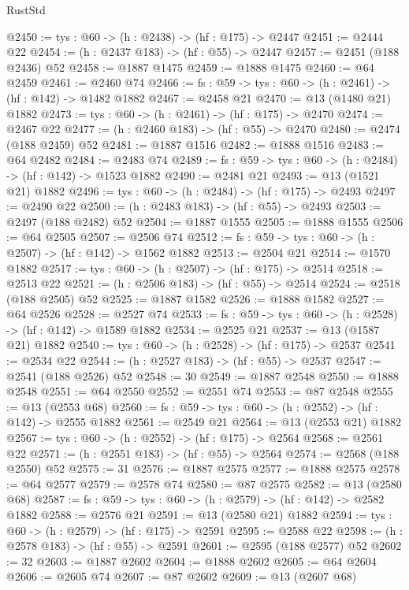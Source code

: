 \begin{lexlean}{RustStd}
\begin{coremodule}
@2450 := {tys : @60} -> (h : @2438) -> (hf : @175) -> @2447
@2451 := @2444 @22
@2454 := (h : @2437 @183) -> (hf : @55) -> @2447
@2457 := @2451 (@188 @2436) @52
@2458 := @1887 @1475
@2459 := @1888 @1475
@2460 := @64 @2459
@2461 := @2460 @74
@2466 := {fs : @59} -> {tys : @60} -> (h : @2461) -> (hf : @142) -> @1482 @1882
@2467 := @2458 @21
@2470 := @13 (@1480 @21) @1882
@2473 := {tys : @60} -> (h : @2461) -> (hf : @175) -> @2470
@2474 := @2467 @22
@2477 := (h : @2460 @183) -> (hf : @55) -> @2470
@2480 := @2474 (@188 @2459) @52
@2481 := @1887 @1516
@2482 := @1888 @1516
@2483 := @64 @2482
@2484 := @2483 @74
@2489 := {fs : @59} -> {tys : @60} -> (h : @2484) -> (hf : @142) -> @1523 @1882
@2490 := @2481 @21
@2493 := @13 (@1521 @21) @1882
@2496 := {tys : @60} -> (h : @2484) -> (hf : @175) -> @2493
@2497 := @2490 @22
@2500 := (h : @2483 @183) -> (hf : @55) -> @2493
@2503 := @2497 (@188 @2482) @52
@2504 := @1887 @1555
@2505 := @1888 @1555
@2506 := @64 @2505
@2507 := @2506 @74
@2512 := {fs : @59} -> {tys : @60} -> (h : @2507) -> (hf : @142) -> @1562 @1882
@2513 := @2504 @21
@2514 := @1570 @1882
@2517 := {tys : @60} -> (h : @2507) -> (hf : @175) -> @2514
@2518 := @2513 @22
@2521 := (h : @2506 @183) -> (hf : @55) -> @2514
@2524 := @2518 (@188 @2505) @52
@2525 := @1887 @1582
@2526 := @1888 @1582
@2527 := @64 @2526
@2528 := @2527 @74
@2533 := {fs : @59} -> {tys : @60} -> (h : @2528) -> (hf : @142) -> @1589 @1882
@2534 := @2525 @21
@2537 := @13 (@1587 @21) @1882
@2540 := {tys : @60} -> (h : @2528) -> (hf : @175) -> @2537
@2541 := @2534 @22
@2544 := (h : @2527 @183) -> (hf : @55) -> @2537
@2547 := @2541 (@188 @2526) @52
@2548 := 30
@2549 := @1887 @2548
@2550 := @1888 @2548
@2551 := @64 @2550
@2552 := @2551 @74
@2553 := @87 @2548
@2555 := @13 (@2553 @68)
@2560 := {fs : @59} -> {tys : @60} -> (h : @2552) -> (hf : @142) -> @2555 @1882
@2561 := @2549 @21
@2564 := @13 (@2553 @21) @1882
@2567 := {tys : @60} -> (h : @2552) -> (hf : @175) -> @2564
@2568 := @2561 @22
@2571 := (h : @2551 @183) -> (hf : @55) -> @2564
@2574 := @2568 (@188 @2550) @52
@2575 := 31
@2576 := @1887 @2575
@2577 := @1888 @2575
@2578 := @64 @2577
@2579 := @2578 @74
@2580 := @87 @2575
@2582 := @13 (@2580 @68)
@2587 := {fs : @59} -> {tys : @60} -> (h : @2579) -> (hf : @142) -> @2582 @1882
@2588 := @2576 @21
@2591 := @13 (@2580 @21) @1882
@2594 := {tys : @60} -> (h : @2579) -> (hf : @175) -> @2591
@2595 := @2588 @22
@2598 := (h : @2578 @183) -> (hf : @55) -> @2591
@2601 := @2595 (@188 @2577) @52
@2602 := 32
@2603 := @1887 @2602
@2604 := @1888 @2602
@2605 := @64 @2604
@2606 := @2605 @74
@2607 := @87 @2602
@2609 := @13 (@2607 @68)

\end{coremodule}
\end{lexlean}
